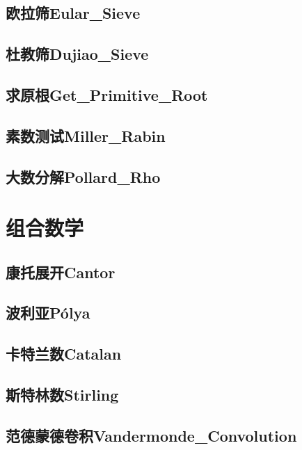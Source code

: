 \documentclass[10pt,a4paper]{article}
\begin{document}
\subsection{欧拉筛Eular\_Sieve}

\subsection{杜教筛Dujiao\_Sieve}

\subsection{求原根Get\_Primitive\_Root}

\subsection{素数测试Miller\_Rabin}

\subsection{大数分解Pollard\_Rho}



\newpage
\section{组合数学}
\subsection{康托展开Cantor}

\subsection{波利亚P\'{o}lya}

\subsection{卡特兰数Catalan}

\subsection{斯特林数Stirling}

\subsection{范德蒙德卷积Vandermonde\_Convolution}

\end{document}
